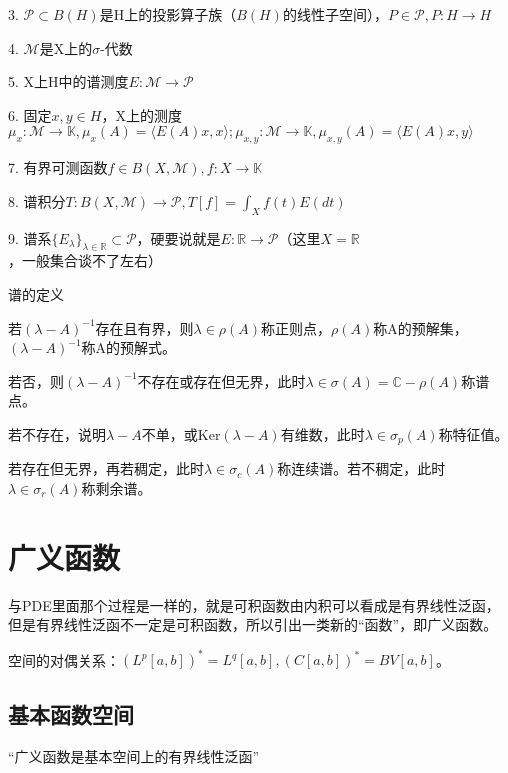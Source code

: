 3. $\mathcal{P} \subset B(H)$是H上的投影算子族（$B(H)$的线性子空间），$P \in \mathcal{P}, P: H \to H$

4. $\mathcal{M}$是X上的$\sigma$-代数

5. X上H中的谱测度$E: \mathcal{M} \to \mathcal{P}$

6. 固定$x, y \in H$，X上的测度$\mu_x: \mathcal{M} \to \mathbb{K}, \mu_x(A) = \langle E(A)x, x \rangle; \mu_{x, y}: \mathcal{M} \to \mathbb{K}, \mu_{x, y}(A) = \langle E(A)x, y \rangle$

7. 有界可测函数$f \in B(X, \mathcal{M}), f: X \to \mathbb{K}$

8. 谱积分$T: B(X, \mathcal{M}) \to \mathcal{P}, T[f] = \int_X f(t) E(dt)$

9. 谱系$\{E_\lambda\}_{\lambda \in \mathbb{R}} \subset \mathcal{P}$，硬要说就是$E: \mathbb{R} \to \mathcal{P}$（这里$X = \mathbb{R}$，一般集合谈不了左右）

谱的定义

若$(\lambda - A)^{-1}$存在且有界，则$\lambda \in \rho(A)$称正则点，$\rho(A)$称A的预解集，$(\lambda - A)^{-1}$称A的预解式。

若否，则$(\lambda - A)^{-1}$不存在或存在但无界，此时$\lambda \in \sigma(A) = \mathbb{C} - \rho(A)$称谱点。

若不存在，说明$\lambda - A$不单，或Ker$(\lambda - A)$有维数，此时$\lambda \in \sigma_p(A)$称特征值。

若存在但无界，再若稠定，此时$\lambda \in \sigma_c(A)$称连续谱。若不稠定，此时$\lambda \in \sigma_r(A)$称剩余谱。 

\section{广义函数}

与PDE里面那个过程是一样的，就是可积函数由内积可以看成是有界线性泛函，但是有界线性泛函不一定是可积函数，所以引出一类新的“函数”，即广义函数。

空间的对偶关系：$(L^p[a, b])^{\ast} = L^q[a, b], (C[a, b])^{\ast} = BV[a, b]$。

\subsection{基本函数空间}

“广义函数是基本空间上的有界线性泛函”

